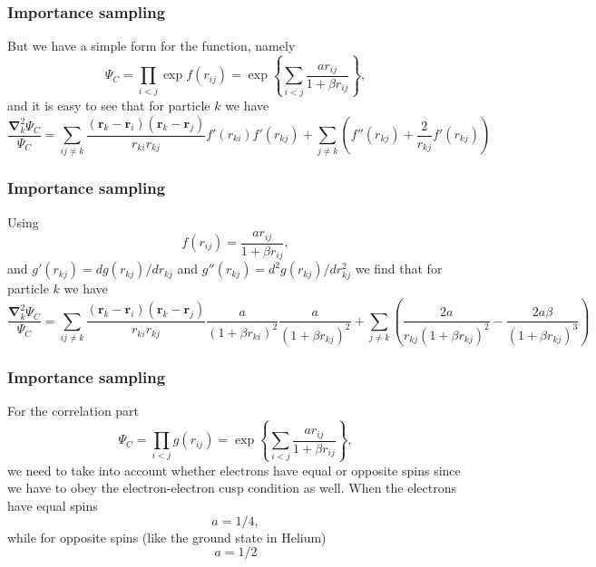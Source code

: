\documentclass{beamer}
\begin{document}
\begin{frame}
\frametitle{Importance sampling}

\begin{block}{}
But we have a simple form for the function, namely
\[
\Psi_{C}=\prod_{i< j}\exp{f(r_{ij})}= \exp{\left\{\sum_{i<j}\frac{ar_{ij}}{1+\beta r_{ij}}\right\}},
\]
and it is easy to see that for particle  $k$
we have
\[
  \frac{\mathbf{\nabla}^2_k \Psi_C}{\Psi_C }=
\sum_{ij\ne k}\frac{(\mathbf{r}_k-\mathbf{r}_i)(\mathbf{r}_k-\mathbf{r}_j)}{r_{ki}r_{kj}}f'(r_{ki})f'(r_{kj})+
\sum_{j\ne k}\left( f''(r_{kj})+\frac{2}{r_{kj}}f'(r_{kj})\right)
\]
\end{block}
\end{frame}

\begin{frame}
\frametitle{Importance sampling}

\begin{block}{}
Using 
\[
f(r_{ij})= \frac{ar_{ij}}{1+\beta r_{ij}},
\]
and $g'(r_{kj})=dg(r_{kj})/dr_{kj}$ and 
$g''(r_{kj})=d^2g(r_{kj})/dr_{kj}^2$  we find that for particle  $k$
we have
\[
  \frac{\mathbf{\nabla}^2_k \Psi_C}{\Psi_C }=
\sum_{ij\ne k}\frac{(\mathbf{r}_k-\mathbf{r}_i)(\mathbf{r}_k-\mathbf{r}_j)}{r_{ki}r_{kj}}\frac{a}{(1+\beta r_{ki})^2}
\frac{a}{(1+\beta r_{kj})^2}+
\sum_{j\ne k}\left(\frac{2a}{r_{kj}(1+\beta r_{kj})^2}-\frac{2a\beta}{(1+\beta r_{kj})^3}\right)
\]
\end{block}
\end{frame}

\begin{frame}
\frametitle{Importance sampling}

\begin{block}{}
For the correlation part 
\[
\Psi_C=\prod_{i< j}g(r_{ij})= \exp{\left\{\sum_{i<j}\frac{ar_{ij}}{1+\beta r_{ij}}\right\}},
\]
we need to take into account whether electrons have equal or opposite spins since we have to obey the
electron-electron cusp condition as well.  
When the electrons have  equal spins 
\[
a= 1/4,
\]
while for opposite spins (like the ground state in Helium)
\[
a= 1/2
\] 
\end{block}
\end{frame}
\end{document}
